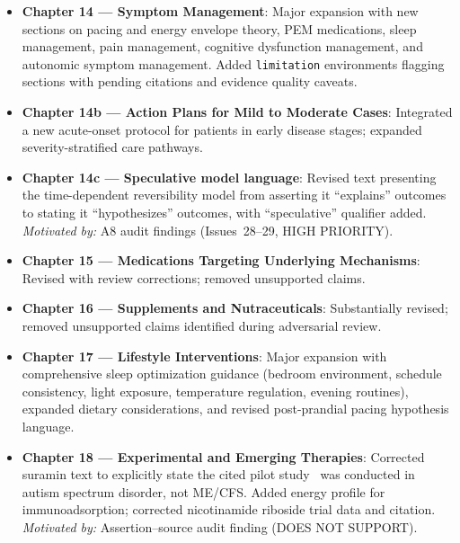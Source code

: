 \begin{itemize}

  \item \textbf{Chapter 14 --- Symptom Management}: Major expansion with
    new sections on pacing and energy envelope theory, PEM medications,
    sleep management, pain management, cognitive dysfunction management,
    and autonomic symptom management. Added \texttt{limitation} environments
    flagging sections with pending citations and evidence quality caveats.

  \item \textbf{Chapter 14b --- Action Plans for Mild to Moderate Cases}: Integrated
    a new acute-onset protocol for patients in early disease stages; expanded
    severity-stratified care pathways.

  \item \textbf{Chapter 14c --- Speculative model language}: Revised text
    presenting the time-dependent reversibility model from asserting it
    ``explains'' outcomes to stating it ``hypothesizes'' outcomes, with
    ``speculative'' qualifier added.
    \textit{Motivated by:} A8 audit findings (Issues~28--29, HIGH PRIORITY).

  \item \textbf{Chapter 15 --- Medications Targeting Underlying Mechanisms}:
    Revised with review corrections; removed unsupported claims.

  \item \textbf{Chapter 16 --- Supplements and Nutraceuticals}: Substantially
    revised; removed unsupported claims identified during adversarial review.

  \item \textbf{Chapter 17 --- Lifestyle Interventions}: Major expansion with
    comprehensive sleep optimization guidance (bedroom environment, schedule
    consistency, light exposure, temperature regulation, evening routines),
    expanded dietary considerations, and revised post-prandial pacing
    hypothesis language.

  \item \textbf{Chapter 18 --- Experimental and Emerging Therapies}: Corrected
    suramin text to explicitly state the cited pilot study~\cite{Naviaux2018suraminpilot}
    was conducted in autism spectrum disorder, not ME/CFS. Added energy profile
    for immunoadsorption; corrected nicotinamide riboside trial data and citation.
    \textit{Motivated by:} Assertion--source audit finding (DOES NOT SUPPORT).


\end{itemize}
